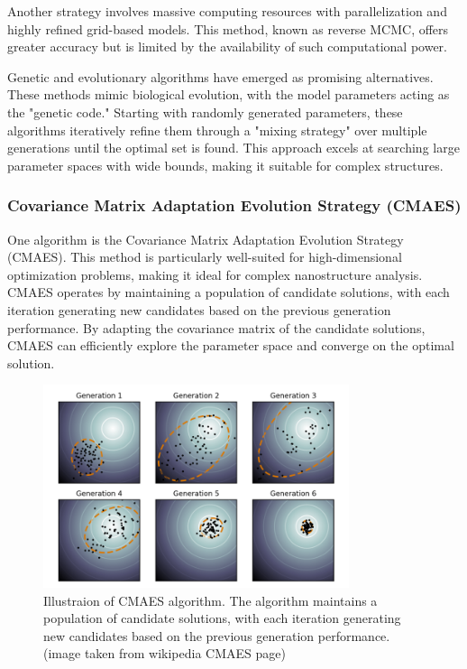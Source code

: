 \medskip

Another strategy involves massive computing resources with parallelization and highly refined grid-based models. 
This method, known as reverse MCMC, offers greater accuracy but is limited by the availability of such computational power.

\medskip

Genetic and evolutionary algorithms have emerged as promising alternatives. These methods mimic biological evolution, 
with the model parameters acting as the "genetic code." Starting with randomly generated parameters, these algorithms 
iteratively refine them through a "mixing strategy" over multiple generations until the optimal set is found. This 
approach excels at searching large parameter spaces with wide bounds, making it suitable for complex structures.
\cite{hannon2016advancing}

\subsubsection{Covariance Matrix Adaptation Evolution Strategy (CMAES)}

One algorithm is the Covariance Matrix Adaptation Evolution Strategy (CMAES). This method is particularly 
well-suited for high-dimensional optimization problems, making it ideal for complex nanostructure analysis. CMAES 
operates by maintaining a population of candidate solutions, with each iteration generating new candidates based on 
the previous generation performance. By adapting the covariance matrix of the candidate solutions, CMAES can efficiently 
explore the parameter space and converge on the optimal solution.

\begin{figure}[h]
    \centering
    \includegraphics[width=0.8\textwidth]{images/CMAES.png}
    \caption{Illustraion of CMAES algorithm. The algorithm maintains a population of candidate solutions, with each 
    iteration generating new candidates based on the previous generation performance.(image taken from wikipedia CMAES page) }
    \label{fig:cmaes}
\end{figure}

